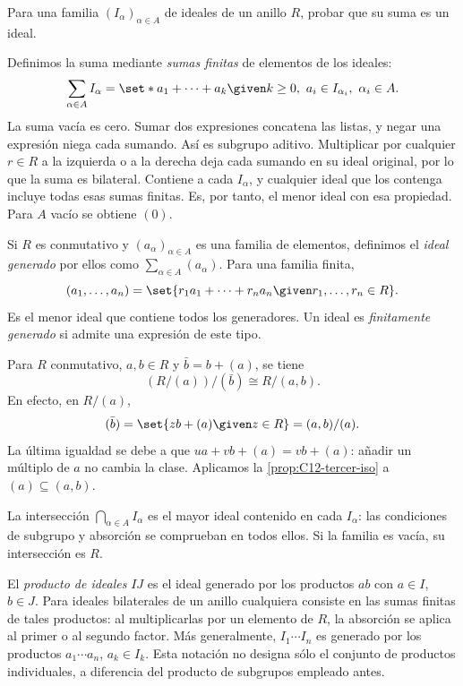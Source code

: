 \begin{ejer}\label{ejer:C12-suma}
Para una familia $(I_\alpha)_{\alpha\in A}$ de ideales de un anillo $R$, probar que su suma es un ideal.
\end{ejer}
\begin{sol}
Definimos la suma mediante \emph{sumas finitas} de elementos de los ideales:
\[
\sum_{\alpha\in A}I_\alpha
=\set*{a_1+\cdots+a_k\given
 k\geq0,\ a_i\in I_{\alpha_i},\ \alpha_i\in A}.
\]
La suma vacía es cero. Sumar dos expresiones concatena las listas, y negar una expresión niega cada sumando. Así es subgrupo aditivo. Multiplicar por cualquier $r\in R$ a la izquierda o a la derecha deja cada sumando en su ideal original, por lo que la suma es bilateral. Contiene a cada $I_\alpha$, y cualquier ideal que los contenga incluye todas esas sumas finitas. Es, por tanto, el menor ideal con esa propiedad. Para $A$ vacío se obtiene $(0)$.
\end{sol}

Si $R$ es conmutativo y $(a_\alpha)_{\alpha\in A}$ es una familia de elementos, definimos el \emph{ideal generado} por ellos como $\sum_{\alpha\in A}(a_\alpha)$. Para una familia finita,
\[
(a_1,\ldots,a_n)
=\set{r_1a_1+\cdots+r_na_n\given r_1,\ldots,r_n\in R}.
\]
Es el menor ideal que contiene todos los generadores. Un ideal es \emph{finitamente generado} si admite una expresión de este tipo.

\begin{ejem}
Para $R$ conmutativo, $a,b\in R$ y $\bar b=b+(a)$, se tiene
\[
(R/(a))/(\bar b)\cong R/(a,b).
\]
En efecto, en $R/(a)$,
\[
(\bar b)=\set{zb+(a)\given z\in R}=(a,b)/(a).
\]
La última igualdad se debe a que $ua+vb+(a)=vb+(a)$: añadir un múltiplo de $a$ no cambia la clase. Aplicamos la \cref{prop:C12-tercer-iso} a $(a)\subseteq(a,b)$.
\end{ejem}

La intersección $\bigcap_{\alpha\in A}I_\alpha$ es el mayor ideal contenido en cada $I_\alpha$: las condiciones de subgrupo y absorción se comprueban en todos ellos. Si la familia es vacía, su intersección es $R$.

El \emph{producto de ideales} $IJ$ es el ideal generado por los productos $ab$ con $a\in I$, $b\in J$. Para ideales bilaterales de un anillo cualquiera consiste en las sumas finitas de tales productos: al multiplicarlas por un elemento de $R$, la absorción se aplica al primer o al segundo factor. Más generalmente, $I_1\cdots I_n$ es generado por los productos $a_1\cdots a_n$, $a_k\in I_k$. Esta notación no designa sólo el conjunto de productos individuales, a diferencia del producto de subgrupos empleado antes.

